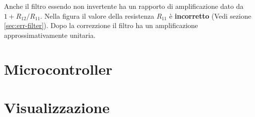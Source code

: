 Anche il filtro essendo non invertente ha un rapporto di amplificazione dato
da \(1+R_{12}/R_{11}\). Nella figura il valore della resistenza \(R_{11}\) \`e
\textbf{incorretto} (Vedi sezione \ref{sec:err-filter}). Dopo la correzzione
il filtro ha un amplificazione approssimativamente unitaria.

\section{Microcontroller}

\section{Visualizzazione}
